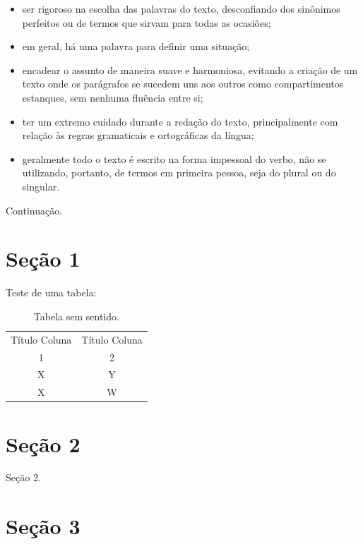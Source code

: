 \documentclass[
	12pt,			%
	openright,		%
	oneside,	
	a4paper,		%
	english,		%
	brazil			%
]{abntex2/abntex2}  %
\begin{document}
\begin{itemize}
		\item ser rigoroso na escolha das palavras do texto, desconfiando dos
sinônimos perfeitos ou de termos que sirvam para todas as ocasiões;

		\item em geral, há uma palavra para definir uma situação;

		\item encadear o assunto de maneira suave e harmoniosa, evitando a
criação de um texto onde os parágrafos se sucedem uns aos outros
como compartimentos estanques, sem nenhuma fluência entre si;

		\item ter um extremo cuidado durante a redação do texto, principalmente
com relação às regras gramaticais e ortográficas da língua;

		\item geralmente todo o texto é escrito na forma impessoal do verbo, não se utilizando,
portanto, de termos em primeira pessoa, seja do plural ou do singular.

	\end{itemize}

	Continuação.
	
	\section{Seção 1}
	
		Teste de uma tabela:

		\begin{table}[htbp]
			\caption{Tabela sem sentido.}
			\label{tabela-ssentido}
			\begin{center}
			\begin{tabular}{|c|c|}
				\hline
				Título Coluna & Título Coluna \\
				1 & 2 \\
				\hline
				X & Y \\
				\hline
				X & W \\
				\hline
			\end{tabular}
			\end{center}
		\end{table}
		
	\section{Seção 2}
	
		Seção 2.

	\section{Seção 3}
	
\end{document}
